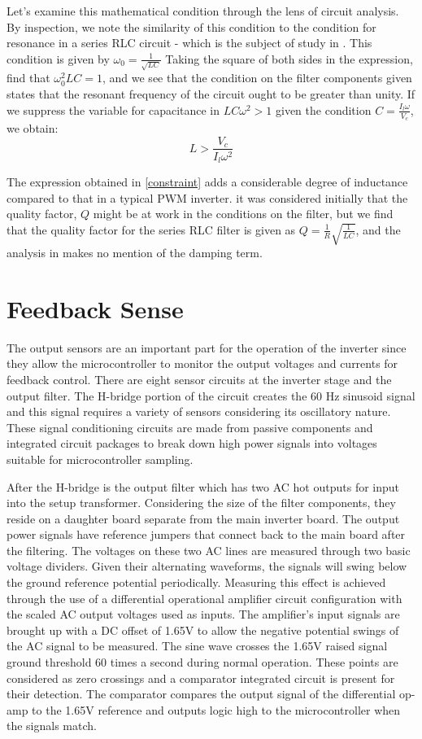 Let's examine this mathematical condition through the lens of circuit analysis. By inspection, we note the similarity of this condition to the condition for resonance in a series RLC circuit - which is the subject of study in \cite{ricardo}. This condition is given by $\omega_0 = \frac{1}{\sqrt{LC}}$ Taking the square of both sides in the expression, find that $\omega_0^2LC=1$, and we see that the condition on the filter components given states that the resonant frequency of the circuit ought to be greater than unity. If we suppress the variable for capacitance in 
$LC\omega^2>1$ given the condition $C=\frac{I_l\omega}{V_c}$, we obtain:
\begin{equation}
\label{constraint}
L > \frac{V_c}{I_l\omega^2}
\end{equation}

The expression obtained in \ref{constraint} adds a considerable degree of inductance compared to that in a typical PWM inverter. it was considered initially that the quality factor, $Q$ might be at work in the conditions on the filter, but we find that the quality factor for the series RLC filter is given as $Q = \frac{1}{R}\sqrt{\frac{1}{LC}}$, and the analysis in \cite{ricardo} makes no mention of the damping term.

\section{Feedback Sense}
The output sensors are an important part for the operation of the inverter since they allow the microcontroller to monitor the output voltages and currents for feedback control. There are eight sensor circuits at the inverter stage and the output filter. The H-bridge portion of the circuit creates the 60 Hz sinusoid signal and this signal requires a variety of sensors considering its oscillatory nature. These signal conditioning circuits are made from passive components and integrated circuit packages to break down high power signals into voltages suitable for microcontroller sampling. 
	
After the H-bridge is the output filter which has two AC hot outputs for input into the setup transformer. Considering the size of the filter components, they reside on a daughter board separate from the main inverter board. The output power signals have reference jumpers that connect back to the main board after the filtering. The voltages on these two AC lines are measured through two basic voltage dividers. Given their alternating waveforms, the signals will swing below the ground reference potential periodically. Measuring this effect is achieved through the use of a differential operational amplifier circuit configuration with the scaled AC output voltages used as inputs. The amplifier's input signals are brought up with a DC offset of 1.65V to allow the negative potential swings of the AC signal to be measured. The sine wave crosses the 1.65V raised signal ground threshold 60 times a second during normal operation. These points are considered as zero crossings and a comparator integrated circuit is present for their detection. The comparator compares the output signal of the differential op-amp to the 1.65V reference and outputs logic high to the microcontroller when the signals match.

